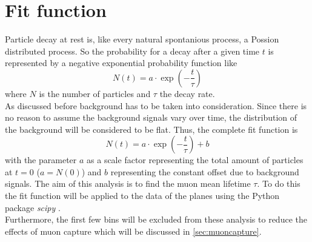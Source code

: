 \section{Fit function}
Particle decay at rest is, like every natural spontanious process, a Possion distributed process.
So the probability for a decay after a given time $t$ is represented by a negative exponential probability function
like 
\begin{equation*}
    N(t) = a \cdot \exp(- \frac{t}{\tau})
\end{equation*}
where $N$ is the number of particles and $\tau$ the decay rate.\\ As discussed before background has 
to be taken into consideration. Since there is no reason to assume the background signals 
vary over time, the distribution of the background will be considered to be flat. Thus, 
the complete fit function is 
\begin{equation}
    N(t) = a \cdot \exp\left(- \frac{t}{\tau}\right) + b 
    \label{eqn:fit}
\end{equation}
with the parameter $a$ as a scale factor representing the total amount of particles at $t=0$ ($ a = N(0)$)
and $b$ representing the constant offset due to background signals. The aim of this analysis is to 
find the muon mean lifetime $\tau$. To do this the fit function will be applied to the data of the planes 
using the Python package \textit{scipy} \cite{scipy}.\\
Furthermore, the first few bins will be excluded from these analysis to reduce the effects of muon capture 
which will be discussed in \autoref{sec:muoncapture}.
